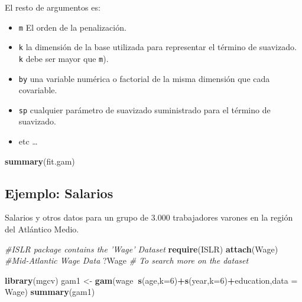\documentclass[]{book}
\newenvironment{Shaded}{\begin{snugshade}}{\end{snugshade}}
\newcommand{\KeywordTok}[1]{\textcolor[rgb]{0.13,0.29,0.53}{\textbf{#1}}}
\newcommand{\DataTypeTok}[1]{\textcolor[rgb]{0.13,0.29,0.53}{#1}}
\newcommand{\DecValTok}[1]{\textcolor[rgb]{0.00,0.00,0.81}{#1}}
\newcommand{\StringTok}[1]{\textcolor[rgb]{0.31,0.60,0.02}{#1}}
\newcommand{\CommentTok}[1]{\textcolor[rgb]{0.56,0.35,0.01}{\textit{#1}}}
\newcommand{\OperatorTok}[1]{\textcolor[rgb]{0.81,0.36,0.00}{\textbf{#1}}}
\newcommand{\NormalTok}[1]{#1}
\providecommand{\tightlist}{%
  \setlength{\itemsep}{0pt}\setlength{\parskip}{0pt}}
\begin{document}
El resto de argumentos es:

\begin{itemize}
\tightlist
\item
  \texttt{m} El orden de la penalización.
\item
  \texttt{k} la dimensión de la base utilizada para representar el
  término de suavizado. \texttt{k} debe ser mayor que \texttt{m}).
\item
  \texttt{by} una variable numérica o factorial de la misma dimensión
  que cada covariable.
\item
  \texttt{sp} cualquier parámetro de suavizado suministrado para el
  término de suavizado.
\item
  etc \ldots{}
\end{itemize}

\begin{Shaded}
\begin{Highlighting}[]
\KeywordTok{summary}\NormalTok{(fit.gam)}
\end{Highlighting}
\end{Shaded}

\subsection{Ejemplo: Salarios}\label{ejemplo-salarios}

Salarios y otros datos para un grupo de 3.000 trabajadores varones en la
región del Atlántico Medio.

\begin{Shaded}
\begin{Highlighting}[]
\CommentTok{#ISLR package contains the 'Wage' Dataset}
\KeywordTok{require}\NormalTok{(ISLR)}
\KeywordTok{attach}\NormalTok{(Wage) }\CommentTok{#Mid-Atlantic Wage Data}
\NormalTok{?Wage }\CommentTok{# To search more on the dataset}
\end{Highlighting}
\end{Shaded}

\begin{Shaded}
\begin{Highlighting}[]
\KeywordTok{library}\NormalTok{(mgcv)}
\NormalTok{gam1 <-}\StringTok{ }\KeywordTok{gam}\NormalTok{(wage}\OperatorTok{~}\KeywordTok{s}\NormalTok{(age,}\DataTypeTok{k=}\DecValTok{6}\NormalTok{)}\OperatorTok{+}\KeywordTok{s}\NormalTok{(year,}\DataTypeTok{k=}\DecValTok{6}\NormalTok{)}\OperatorTok{+}\NormalTok{education,}\DataTypeTok{data =}\NormalTok{ Wage)}
\KeywordTok{summary}\NormalTok{(gam1)}
\end{Highlighting}
\end{Shaded}
\end{document}
